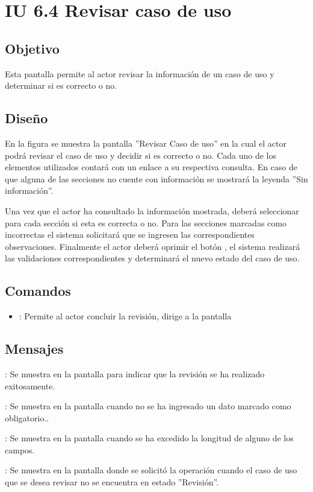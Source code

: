 \section{IU 6.4 Revisar caso de uso}

\subsection{Objetivo}
	Esta pantalla permite al actor revisar la información de un caso de uso y determinar si es correcto o no.
\subsection{Diseño}
	En la figura  se muestra la pantalla ''Revisar Caso de uso'' en la cual el actor podrá revisar el caso de uso y decidir si es correcto o no. Cada uno de los elementos utilizados contará con un enlace a su respectiva consulta. En caso de que alguna de las secciones no cuente con información se mostrará la leyenda ''Sin información''.
	
	Una vez que el actor ha consultado la información mostrada, deberá seleccionar para cada sección si esta es correcta o no. Para las secciones marcadas como incorrectas el sistema solicitará que se ingresen las correspondientes observaciones. Finalmente el actor deberá oprimir el botón  , el sistema realizará las validaciones correspondientes y determinará el nuevo estado del caso de uso.

\subsection{Comandos}
\begin{itemize}
	\item {}: Permite al actor concluir la revisión, dirige a la pantalla 
\end{itemize}

\subsection{Mensajes}

\begin{Citemize}
	\item {}: Se muestra en la pantalla  para indicar que la revisión se ha realizado exitosamente.
	\item {}: Se muestra en la pantalla  cuando no se ha ingresado un dato marcado como obligatorio..
	\item {}: Se muestra en la pantalla  cuando se ha excedido la longitud de alguno de los campos.
	\item {}: Se muestra en la pantalla donde se solicitó la operación cuando el caso de uso que se desea revisar no se encuentra en estado ''Revisión''.
\end{Citemize}
